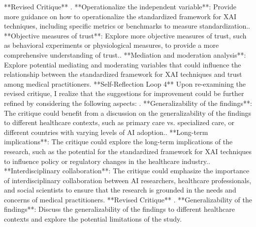 \documentclass{article}%
\begin{document}
\newline%
**Revised Critique**\newline%
. **Operationalize the independent variable**: Provide more guidance on how to operationalize the standardized framework for XAI techniques, including specific metrics or benchmarks to measure standardization.. **Objective measures of trust**: Explore more objective measures of trust, such as behavioral experiments or physiological measures, to provide a more comprehensive understanding of trust.. **Mediation and moderation analysis**: Explore potential mediating and moderating variables that could influence the relationship between the standardized framework for XAI techniques and trust among medical practitioners.\newline%
\newline%
**Self{-}Reflection Loop 4**\newline%
\newline%
Upon re{-}examining the revised critique, I realize that the suggestions for improvement could be further refined by considering the following aspects:\newline%
. **Generalizability of the findings**: The critique could benefit from a discussion on the generalizability of the findings to different healthcare contexts, such as primary care vs. specialized care, or different countries with varying levels of AI adoption.. **Long{-}term implications**: The critique could explore the long{-}term implications of the research, such as the potential for the standardized framework for XAI techniques to influence policy or regulatory changes in the healthcare industry.. **Interdisciplinary collaboration**: The critique could emphasize the importance of interdisciplinary collaboration between AI researchers, healthcare professionals, and social scientists to ensure that the research is grounded in the needs and concerns of medical practitioners.\newline%
\newline%
**Revised Critique**\newline%
. **Generalizability of the findings**: Discuss the generalizability of the findings to different healthcare contexts and explore the potential limitations of the study.\newline%
\end{document}
